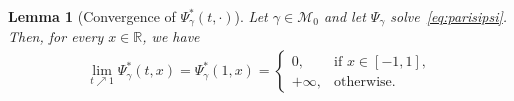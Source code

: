 \documentclass[11pt]{amsart}
\newtheorem{lemma}[proposition]{Lemma}
\theoremstyle{remark}
\theoremstyle{definition}
\numberwithin{equation}{section}
\numberwithin{proposition}{section}
\numberwithin{figure}{section}
\numberwithin{table}{section}
\newcommand{\R}{\mathbb{R}}
\newcommand{\1}{\mathbf{1}}
\newcommand{\mcl}{\mathcal}
\begin{document}


\begin{lemma}[Convergence of $\Psi_\gamma^*(t,\cdot)$]\label{l.Phi^*_cvg}
Let $\gamma\in\mcl M_0$ and let $\Psi_\gamma$ solve~\eqref{eq:parisipsi}. Then, for every $x\in\R$, we have
\begin{align}\label{e.l.Phi^*_cvg}
    \lim_{t\nearrow1}\Psi^*_\gamma(t,x)  = \Psi^*_\gamma(1,x)=
    \begin{cases}
        0, & \text{if $x\in [-1,1]$},
        \\
        +\infty, & \text{otherwise}.
    \end{cases}
\end{align}
\end{lemma}
\end{document}
